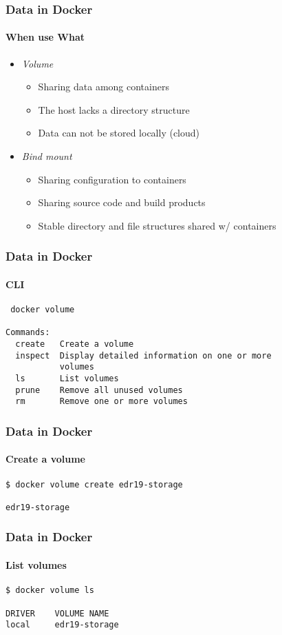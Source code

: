 \begin{frame}[fragile]
\frametitle{Data in Docker}
\framesubtitle{When use What}

\begin{itemize}
\item \textit{Volume}
  \begin{itemize}
  \item Sharing data among containers
  \item The host lacks a directory structure
  \item Data can not be stored locally (cloud)
  \end{itemize}
\item \textit{Bind mount}
  \begin{itemize}
  \item Sharing configuration to containers
  \item Sharing source code and build products
  \item Stable directory and file structures shared w/ containers
  \end{itemize}
\end{itemize}
\end{frame}

\begin{frame}[fragile]
\frametitle{Data in Docker}
\framesubtitle{CLI}

\begin{lstlisting}
 docker volume

Commands:
  create   Create a volume
  inspect  Display detailed information on one or more
           volumes
  ls       List volumes
  prune    Remove all unused volumes
  rm       Remove one or more volumes
\end{lstlisting}
\end{frame}


\begin{frame}[fragile]
\frametitle{Data in Docker}
\framesubtitle{Create a volume}

\begin{lstlisting}
$ docker volume create edr19-storage

edr19-storage
\end{lstlisting}
\end{frame}

\begin{frame}[fragile]
\frametitle{Data in Docker}
\framesubtitle{List volumes}


\begin{lstlisting}
$ docker volume ls

DRIVER    VOLUME NAME
local     edr19-storage
\end{lstlisting}
\end{frame}

